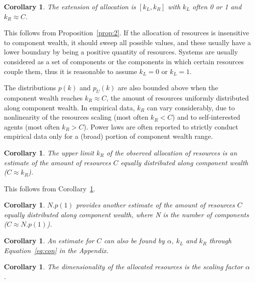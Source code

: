 \documentclass[a4paper, 11pt]{article} %
\newtheorem{corollary}[theorem2]{Corollary}
\begin{document}
 \begin{corollary}\label{cor:2}
	The extension of allocation is $[k_L,k_R]$ with $k_L$ often 0 or 1 and $k_R\approx C$.
\end{corollary}

This follows from Proposition~\ref{prop:2}.
If the allocation of resources is insensitive to component wealth,
it should sweep all possible values, and these usually
have a lower boundary by being a positive quantity of resources.
Systems are usually considered as a set of components
or the components in which certain resources couple them,
thus it is reasonable to assume $k_L=0$ or $k_L=1$.

The distributions $p(k)$ and $p_U(k)$ are also
bounded above when the component wealth reaches $k_R \approx C$,
the amount of resources uniformly distributed along component wealth.
In empirical data, $k_R$ can vary considerably, due to
nonlinearity of the resources scaling (most often $k_R<C$) and
to self-interested agents (most often $k_R>C$).
Power laws are often reported to strictly conduct empirical data
only for a (broad) portion of component wealth range.


\begin{corollary}
	The upper limit $k_R$ of the observed allocation of resources is an estimate of the amount of resources $C$ equally distributed along component wealth ($C\approx k_R$).
\end{corollary}

This follows from Corollary~\ref{cor:2}.

\begin{corollary}
	$N . p(1)$ provides another estimate of the amount of resources $C$ equally distributed along component wealth, where N is the number of components ($C\approx N . p(1)$).
\end{corollary}

\begin{corollary}
	An estimate for $C$ can also be found by $\alpha$, $k_L$ and $k_R$ through Equation~\ref{eq:con} in the Appendix.
\end{corollary}

\begin{corollary}
	The dimensionality of the allocated resources is the scaling factor $\alpha$.
\end{corollary}
\end{document}

